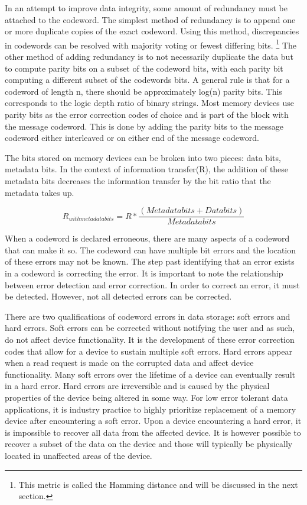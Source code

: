 \documentclass[letterpaper, 10 pt, conference]{ieeeconf}
\begin{document}
In an attempt to improve data integrity, some amount of redundancy must be attached to the codeword.  The simplest method of redundancy is to append one or more duplicate copies of the exact codeword.  Using this method, discrepancies in codewords can be resolved with majority voting or fewest differing bits. \footnote{This metric is called the Hamming distance and will be discussed in the next section.}  The other method of adding redundancy is to not necessarily duplicate the data but to compute parity bits on a subset of the codeword bits, with each parity bit computing a different subset of the codewords bits.  A general rule is that for a codeword of length n, there should be approximately log(n) parity bits.  This corresponds to the logic depth ratio of binary strings.  Most memory devices use parity bits as the error correction codes of choice and is part of the block with the message codeword.  This is done by adding the parity bits to the message codeword either interleaved or on either end of the message codeword.

The bits stored on memory devices can be broken into two pieces: data bits, metadata bits.  In the context of information transfer(R), the addition of these metadata bits decreases the information transfer by the bit ratio that the metadata takes up.

\begin{equation}

R_{with metadata bits} = R * \frac{(Metadata bits + Data bits)}{Metadata bits}

\end{equation}

When a codeword is declared erroneous, there are many aspects of a codeword that can make it so.  The codeword can have multiple bit errors and the location of these errors may not be known. The step past identifying that an error exists in a codeword is correcting the error.  It is important to note the relationship between error detection and error correction.  In order to correct an error, it must be detected.  However, not all detected errors can be corrected.

There are two qualifications of codeword errors in data storage: soft errors and hard errors.  Soft errors can be corrected without notifying the user and as such, do not affect device functionality.  It is the development of these error correction codes that allow for a device to sustain multiple soft errors.  Hard errors appear when a read request is made on the corrupted data and affect device functionality.  Many soft errors over the lifetime of a device can eventually result in a hard error.  Hard errors are irreversible and is caused by the physical properties of the device being altered in some way.  For low error tolerant data applications, it is industry practice to highly prioritize replacement of a memory device after encountering a soft error.\cite{DRAM}  Upon a device encountering a hard error, it is impossible to recover all data from the affected device.  It is however possible to recover a subset of the data on the device and those will typically be physically located in unaffected areas of the device.
\end{document}
